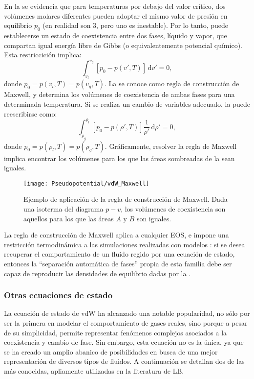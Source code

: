 En la  se evidencia que para temperaturas por debajo del valor cr\'itico, dos vol\'umenes molares diferentes pueden adoptar el mismo valor de presi\'on en equilibrio $p_0$ (en realidad son 3, pero uno es inestable). Por lo tanto, puede establecerse un estado de coexistencia entre dos fases, l\'iquido y vapor, que compartan igual energ\'ia libre de Gibbs (o equivalentemente potencial qu\'imico). Esta restriccici\'on implica:
\begin{equation}
	\int_{v_l}^{v_g} \left[p_0 - p(v',T)\right] \, \mbox{d} v' = 0,
	\label{eq:maxwell_constr}
\end{equation}
donde $p_0 = p(v_l,T) = p(v_g,T)$. La  se conoce como regla de construcci\'on de Maxwell, y determina los vol\'umenes de coexistencia de ambas fases para una determinada temperatura. Si se realiza un cambio de variables adecuado, la  puede reescribirse como:
\begin{equation}
	\int_{\rho_g}^{\rho_l} \left[p_0 - p(\rho',T)\right] \dfrac{1}{\rho'} \, \mbox{d} \rho' = 0,
	\label{eq:maxwell_constr_rho}
\end{equation}
donde $p_0 = p(\rho_l,T) = p(\rho_g,T)$. Gr\'aficamente, resolver la regla de Maxwell implica encontrar los vol\'umenes para los que las \'areas sombreadas de la  sean iguales. 

\begin{figure}[ht]
	\centering
	\texttt{[image: Pseudopotential/vdW\_Maxwell]}
	\caption{Ejemplo de aplicaci\'on de la regla de construcci\'on de Maxwell. Dada una isoterma del diagrama $p-v$, los vol\'umenes de coexistencia son aquellos para los que las \'areas $A$ y $B$ son iguales.}
	\label{fig:vdW_Maxwell}
\end{figure}


La regla de construcci\'on de Maxwell aplica a cualquier EOS, e impone una restricci\'on termodin\'amica a las simulaciones realizadas con modelos \pp{}: si se desea recuperar el comportamiento de un fluido regido por una ecuaci\'on de estado, entonces la ``separaci\'on autom\'atica de fases'' propia de esta familia debe ser capaz de reproducir las densidades de equilibrio dadas por la .


\subsubsection*{Otras ecuaciones de estado}

La ecuaci\'on de estado de vdW ha alcanzado una notable popularidad, no s\'olo por ser la primera en modelar el comportamiento de gases reales, sino porque a pesar de su simplicidad, permite representar fen\'omenos complejos asociados a la coexistencia y cambio de fase. Sin embargo, esta ecuaci\'on no es la \'unica, ya que se ha creado un amplio abanico de posibilidades en busca de una mejor representaci\'on de diversos tipos de fluidos. A continuaci\'on se detallan dos de las m\'as conocidas, apliamente utilizadas en la literatura de LB.

